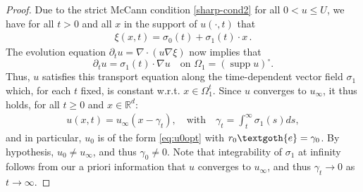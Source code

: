 \documentclass[reqno]{amsart}
\newcommand{\R}{\mathbb{R}}
\DeclareMathOperator{\supp}{supp}
\begin{document}
\begin{proof}
  Due to the strict McCann condition \eqref{sharp-cond2} for all $0<u\leq U$, we have for all $t>0$ and all $x$ in the support of $u(\cdot,t)$ that
  \begin{align}
    \label{eq:add-1}
    \xi(x,t) = \sigma_0(t)+\sigma_1(t)\cdot x\,.
  \end{align}
  The evolution equation $\partial_tu=\nabla\cdot(u\nabla\xi)$ now implies that
  \begin{equation*}%
    \partial_tu = \sigma_1(t)\cdot\nabla u \quad \mbox{on }\Omega_1=(\supp u)^\circ.  
  \end{equation*}
Thus, $u$ satisfies this transport equation along the time-dependent vector field $\sigma_1$ which, for each $t$ fixed, is constant w.r.t. $x\in\Omega_1^t$. 
Since $u$ converges to $u_\infty$, it thus holds, for all $t\ge0$ and $x\in\R^d$:
  \begin{align*}
    u(x,t) = u_\infty(x-\gamma_t), \quad\text{with}\quad \gamma_t=\int_t^\infty\sigma_1(s)ds,
  \end{align*}
  and in particular, $u_0$ is of the form \eqref{eq:u0opt} with $r_0\textgoth{e}=\gamma_0$.
  By hypothesis, $u_0\neq u_\infty$, and thus $\gamma_0\neq0$.
  Note that integrability of $\sigma_1$ at infinity follows from our a priori information that $u$ converges to $u_\infty$, and thus $\gamma_t\to0$ as $t\to\infty$.
  

\end{proof}
\end{document}
